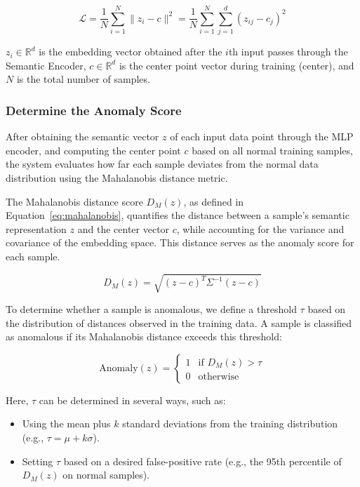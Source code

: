 \begin{ZhChapter}
\begin{equation}
\mathcal{L} = \frac{1}{N} \sum_{i=1}^{N} \| z_i - c \|^2 
= \frac{1}{N} \sum_{i=1}^{N} \sum_{j=1}^{d} (z_{ij} - c_j)^2
\label{eq:centerloss}
\end{equation}

$z_i \in \mathbb{R}^d$ is the embedding vector obtained after the $i$th input passes through the Semantic Encoder,  
$c \in \mathbb{R}^d$ is the center point vector during training (center), and $N$ is the total number of samples.



\subsubsection{Determine the Anomaly Score}
After obtaining the semantic vector $z$ of each input data point through the MLP encoder, and computing the center point $c$ based on all normal training samples, the system evaluates how far each sample deviates from the normal data distribution using the Mahalanobis distance metric.

The Mahalanobis distance score $D_M(z)$, as defined in Equation~\ref{eq:mahalanobis}, quantifies the distance between a sample's semantic representation $z$ and the center vector $c$, while accounting for the variance and covariance of the embedding space. This distance serves as the anomaly score for each sample.

\begin{equation}
D_M(z) = \sqrt{(z - c)^T \Sigma^{-1} (z - c)}
\end{equation}

To determine whether a sample is anomalous, we define a threshold $\tau$ based on the distribution of distances observed in the training data. A sample is classified as anomalous if its Mahalanobis distance exceeds this threshold:

\begin{equation}
\text{Anomaly}(z) = 
\begin{cases}
1 & \text{if } D_M(z) > \tau \\
0 & \text{otherwise}
\end{cases}
\end{equation}

Here, $\tau$ can be determined in several ways, such as:
\begin{itemize}
    \item Using the mean plus $k$ standard deviations from the training distribution (e.g., $\tau = \mu + k\sigma$).
    \item Setting $\tau$ based on a desired false-positive rate (e.g., the 95th percentile of $D_M(z)$ on normal samples).
\end{itemize}


\end{ZhChapter}
